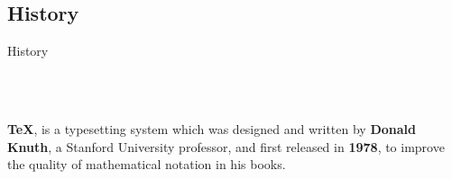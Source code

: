 \documentclass[10pt,xcolor={dvipsnames}]{beamer}
\begin{document}
	\subsection{History}
		\begin{frame}{History}
			\pause
					
			\begin{columns}[T] %
				\begin{column}{.65\textwidth}
					\onslide<2->
					~\\~\\\textbf{\color{beamer@headercolor}\TeX}, is a typesetting system which was designed and written by \textbf{\color{beamer@headercolor}Donald Knuth}, 
					a Stanford University professor, and first released in \textbf{\color{beamer@headercolor}1978}, to improve the quality of mathematical notation in his books.\newline \newline \newline \newline
					

\end{column}
\end{columns}
\end{frame}
\end{document}
